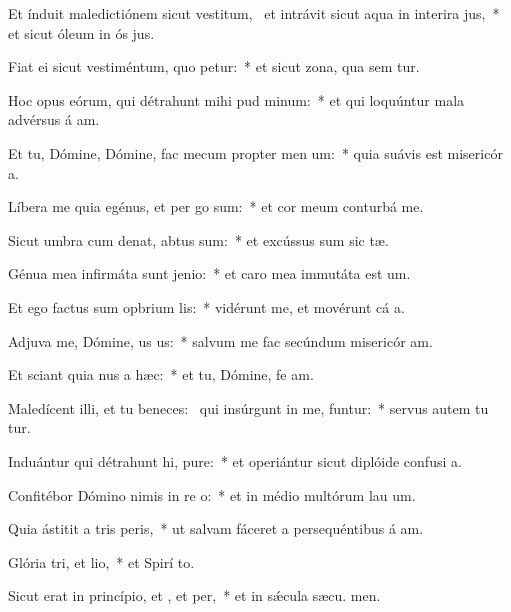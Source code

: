 \item Et índuit maledictiónem sicut vestitum,~\pscross{} et intrávit sicut aqua in interira jus,~* et sicut óleum in ós jus.
\item Fiat ei sicut vestiméntum, quo petur:~* et sicut zona, qua sem tur.
\item Hoc opus eórum, qui détrahunt mihi pud minum:~* et qui loquúntur mala advérsus á am.
\item Et tu, Dómine, Dómine, fac mecum propter men um:~* quia suávis est misericór a.
\item Líbera me quia egénus, et per go sum:~* et cor meum conturbá   me.
\item Sicut umbra cum denat, abtus sum:~* et excússus sum sic tæ.
\item Génua mea infirmáta sunt  jenio:~* et caro mea immutáta est  um.
\item Et ego factus sum opbrium lis:~* vidérunt me, et movérunt cá a.
\item Adjuva me, Dómine, us us:~* salvum me fac secúndum misericór am.
\item Et sciant quia nus a hæc:~* et tu, Dómine, fe am.
\item Maledícent illi, et tu beneces:~\pscross{} qui insúrgunt in me, funtur:~* servus autem tu tur.
\item Induántur qui détrahunt hi, pure:~* et operiántur sicut diplóide confusi a.
\item Confitébor Dómino nimis in re o:~* et in médio multórum lau um.
\item Quia ástitit a tris peris,~* ut salvam fáceret a persequéntibus á am.
\item Glória tri, et lio,~* et Spirí to.
\item Sicut erat in princípio, et , et per,~* et in sǽcula sæcu. men.
